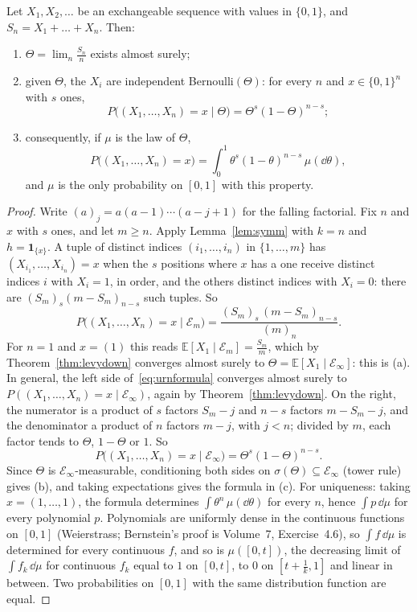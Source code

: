 \begin{theorem}[de Finetti, 1931]\label{thm:definetti}
Let $X_1,X_2,\dots$ be an exchangeable sequence with values in $\{0,1\}$, and $S_n=X_1+\dots+X_n$. Then:
\begin{enumerate}[label=(\alph*)]
\item $\Theta=\lim_n\frac{S_n}n$ exists almost surely;
\item given $\Theta$, the $X_i$ are independent Bernoulli$(\Theta)$: for every $n$ and $x\in\{0,1\}^n$ with $s$ ones,
\[
P\bigl((X_1,\dots,X_n)=x\mid\Theta\bigr)=\Theta^s(1-\Theta)^{n-s};
\]
\item consequently, if $\mu$ is the law of $\Theta$,
\[
P\bigl((X_1,\dots,X_n)=x\bigr)=\int_0^1\theta^s(1-\theta)^{n-s}\,\mu(\dd\theta),
\]
and $\mu$ is the only probability on $[0,1]$ with this property.
\end{enumerate}
\end{theorem}
\begin{proof}
Write $(a)_j=a(a-1)\cdots(a-j+1)$ for the falling factorial. Fix $n$ and $x$ with $s$ ones, and let $m\ge n$. Apply Lemma~\ref{lem:symm} with $k=n$ and $h=\mathbf 1_{\{x\}}$. A tuple of distinct indices
$(i_1,\dots,i_n)$ in $\{1,\dots,m\}$ has $(X_{i_1},\dots,X_{i_n})=x$ when the $s$ positions where $x$ has a one receive distinct indices $i$ with $X_i=1$, in order, and the others distinct indices
with $X_i=0$: there are $(S_m)_s(m-S_m)_{n-s}$ such tuples. So
\begin{equation}\label{eq:urnformula}
P\bigl((X_1,\dots,X_n)=x\mid\mathcal E_m\bigr)=\frac{(S_m)_s\,(m-S_m)_{n-s}}{(m)_n}.
\end{equation}
For $n=1$ and $x=(1)$ this reads $\mathbb E[X_1\mid\mathcal E_m]=\frac{S_m}m$, which by Theorem~\ref{thm:levydown} converges almost surely to $\Theta=\mathbb E[X_1\mid\mathcal E_\infty]$: this is (a). In general, the left side
of~\eqref{eq:urnformula} converges almost surely to $P((X_1,\dots,X_n)=x\mid\mathcal E_\infty)$, again by Theorem~\ref{thm:levydown}. On the right, the numerator is a product of $s$ factors $S_m-j$ and $n-s$ factors $m-S_m-j$, and the
denominator a product of $n$ factors $m-j$, with $j<n$; divided by $m$, each factor tends to $\Theta$, $1-\Theta$ or $1$. So
\[
P\bigl((X_1,\dots,X_n)=x\mid\mathcal E_\infty\bigr)=\Theta^s(1-\Theta)^{n-s}.
\]
Since $\Theta$ is $\mathcal E_\infty$-measurable, conditioning both sides on $\sigma(\Theta)\subseteq\mathcal E_\infty$ (tower rule) gives (b), and taking expectations gives the formula in (c).
For uniqueness: taking $x=(1,\dots,1)$, the formula determines $\int\theta^n\,\mu(\dd\theta)$ for every $n$, hence $\int p\,\dd\mu$ for every polynomial $p$. Polynomials are uniformly dense in the continuous
functions on $[0,1]$ (Weierstrass; Bernstein's proof is Volume~7, Exercise~4.6), so $\int f\,\dd\mu$ is determined for every continuous $f$, and so is $\mu([0,t])$, the decreasing limit of $\int f_k\,\dd\mu$ for
continuous $f_k$ equal to $1$ on $[0,t]$, to $0$ on $[t+\frac1k,1]$ and linear in between. Two probabilities on $[0,1]$ with the same distribution function are equal.
\end{proof}

